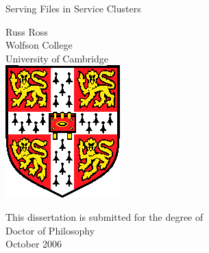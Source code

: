 \pagestyle{empty}

\begin{center}
\vspace*{\fill}

%

\Huge
Serving Files in Service Clusters

\vfill
\vfill

\LARGE 
Russ Ross\\[6mm]
Wolfson College\\
University of Cambridge\\

\vfill
\includegraphics{eps/camshield}
\vfill

\Large
This dissertation is submitted for the degree of\\
Doctor of Philosophy\\[4mm]

October 2006

\vspace*{\fill}
\end{center}
\cleardoublepage

\pagestyle{plain}

%

%  
%

%

%        
%

%

